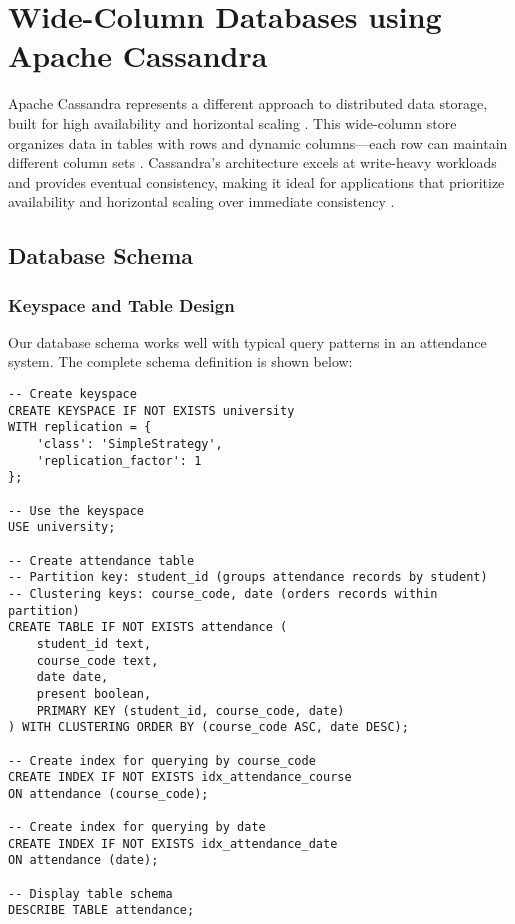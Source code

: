 \chapter{Wide-Column Databases using Apache Cassandra}

Apache Cassandra represents a different approach to distributed data storage, built for high availability and horizontal scaling \parencite{cassandra_architecture}. This wide-column store organizes data in tables with rows and dynamic columns—each row can maintain different column sets \parencite{cassandra_documentation}. Cassandra's architecture excels at write-heavy workloads and provides eventual consistency, making it ideal for applications that prioritize availability and horizontal scaling over immediate consistency \parencite{cassandra_architecture}.

\section{Database Schema}

\subsection{Keyspace and Table Design}
Our database schema works well with typical query patterns in an attendance system. The complete schema definition is shown below:

\begin{verbatim}
-- Create keyspace
CREATE KEYSPACE IF NOT EXISTS university
WITH replication = {
    'class': 'SimpleStrategy',
    'replication_factor': 1
};

-- Use the keyspace
USE university;

-- Create attendance table
-- Partition key: student_id (groups attendance records by student)
-- Clustering keys: course_code, date (orders records within partition)
CREATE TABLE IF NOT EXISTS attendance (
    student_id text,
    course_code text,
    date date,
    present boolean,
    PRIMARY KEY (student_id, course_code, date)
) WITH CLUSTERING ORDER BY (course_code ASC, date DESC);

-- Create index for querying by course_code
CREATE INDEX IF NOT EXISTS idx_attendance_course
ON attendance (course_code);

-- Create index for querying by date
CREATE INDEX IF NOT EXISTS idx_attendance_date
ON attendance (date);

-- Display table schema
DESCRIBE TABLE attendance;
\end{verbatim}

